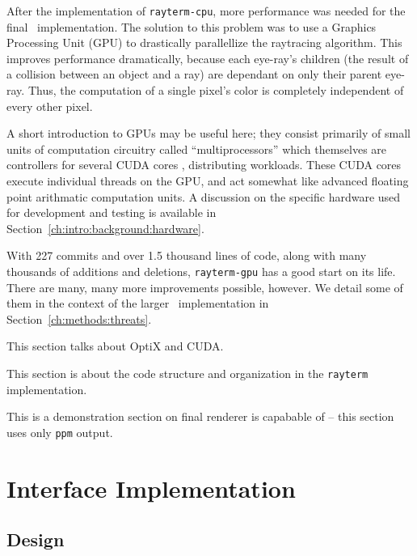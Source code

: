 After the implementation of \texttt{rayterm-cpu}, more performance was needed for the final \name\ implementation.
The solution to this problem was to use a Graphics Processing Unit (GPU) to drastically parallellize the raytracing algorithm.
This improves performance dramatically, because each eye-ray's children (the result of a collision between an object and a ray) are dependant on only their parent eye-ray.
Thus, the computation of a single pixel's color is completely independent of every other pixel.

A short introduction to GPUs may be useful here; they consist primarily of small units of computation circuitry called ``multiprocessors'' which themselves are controllers for several CUDA cores \cite{fermi2009nvidia}, distributing workloads.
These CUDA cores execute individual threads on the GPU, and act somewhat like advanced floating point arithmatic computation units.
A discussion on the specific hardware used for development and testing is available in Section~\ref{ch:intro:background:hardware}.

With 227 commits and over 1.5 thousand lines of code, along with many thousands of additions and deletions, \texttt{rayterm-gpu} has a good start on its life.
There are many, many more improvements possible, however.
We detail some of them in the context of the larger \name\ implementation in Section~\ref{ch:methods:threats}.

 \label{ch:methods:renderer:parallel:libraries}

This section talks about OptiX and CUDA.

 \label{ch:methods:renderer:parallel:design}

This section is about the code structure and organization in the \texttt{rayterm} implementation.

 \label{ch:methods:renderer:parallel:demo}

This is a demonstration section on final renderer is capabable of -- this section uses only \texttt{ppm} output.

\section{Interface Implementation} \label{ch:methods:interface}

\subsection{Design} \label{ch:methods:interface:design}

